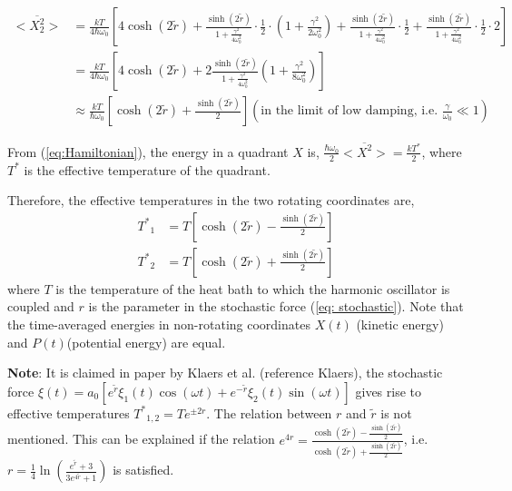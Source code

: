 \documentclass[12pt, twoside]{article}
\begin{document}
 $\begin{aligned}
 <\overline { X _ { 2 } ^ { 2 } } > &= \frac{kT}{4\hbar\omega_0}\left[4\cosh(2\tilde{r}) + \frac{\sinh(2\tilde{r})}{1+\frac{\gamma^2}{4\omega_0^2}}\cdot\frac{1}{2}\cdot\left(1+\frac{\gamma^2}{2\omega_0^2}\right) + \frac{\sinh(2\tilde{r})}{1+\frac{\gamma^2}{4\omega_0^2}}\cdot\frac{1}{2} + \frac{\sinh(2\tilde{r})}{1+\frac{\gamma^2}{4\omega_0^2}}\cdot\frac{1}{2}\cdot2 \right]
 \\ & = \frac{kT}{4\hbar\omega_0}\left[4\cosh(2\tilde{r}) + 2\frac{\sinh(2\tilde{r})}{1+\frac{\gamma^2}{4\omega_0^2}}\left(1+\frac{\gamma^2}{8\omega_0^2}\right) \right]
 \\ & \approx \frac{kT}{\hbar\omega_0}\left[\cosh(2\tilde{r}) + \frac{\sinh(2\tilde{r})}{2}\right] \left(\text{in the limit of low damping, i.e. } \frac{\gamma}{\omega_0} \ll 1\right)
 \end{aligned}$
 
 From (\ref{eq:Hamiltonian}), the energy in a quadrant $X$ is,  $\frac{\hbar\omega_0}{2} <\overline { X ^ { 2 } } > = \frac{kT^*}{2}$, where $T^*$ is the effective temperature of the quadrant.
 
 Therefore, the effective temperatures in the two rotating coordinates are,
 \begin{equation}\label{eq:eff_temp}
 \begin{aligned}
 {T^*}_1 &= T \left[\cosh(2\tilde{r}) - \frac{\sinh(2\tilde{r})}{2}\right]
 \\ {T^*}_2 &= T \left[\cosh(2\tilde{r}) + \frac{\sinh(2\tilde{r})}{2}\right]
 \end{aligned}
 \end{equation}
 where $T$ is the temperature of the heat bath to which the harmonic oscillator is coupled and $r$ is the parameter in the stochastic force (\ref{eq: stochastic}). Note that the time-averaged energies in non-rotating coordinates $X(t)$ (kinetic energy) and $P(t)$(potential energy) are equal.
 
 \textbf{Note}: It is claimed in paper by Klaers et al. (reference Klaers), the stochastic force $\xi(t) =  a_0 [e^{\tilde{r}} \xi_1(t) \cos(\omega t) + e^{-{\tilde{r}}} \xi_2(t)\sin(\omega t)]$ gives rise to effective temperatures ${T^*}_{1,2}
= T e^{\pm 2r}$. The relation between $r$ and $\tilde{r}$ is not mentioned. This can be explained if the relation $e^{4r} = \frac{\cosh(2\tilde{r}) - \frac{\sinh(2\tilde{r})}{2}}{\cosh(2\tilde{r}) + \frac{\sinh(2\tilde{r})}{2}}$, i.e. $r = \frac{1}{4}\ln(\frac{e^{\tilde{r}} + 3}{3 e^{4\tilde{r}} + 1})$ is satisfied.
\end{document}
